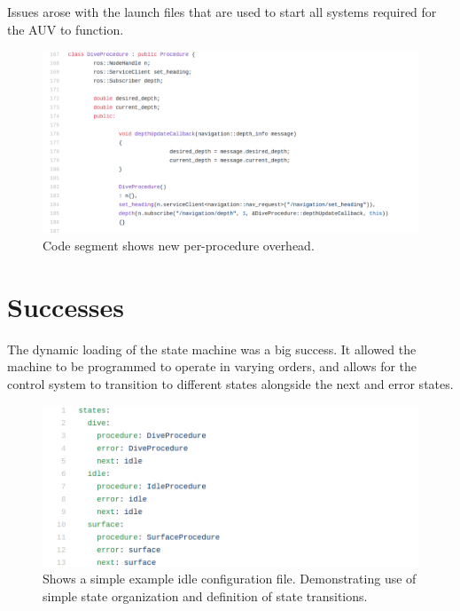 Issues arose with the launch files that are used to start all systems required
for the AUV to function. 

\begin{figure}
\centering
\includegraphics[width=150mm]{Figures/NewProcedureOverhead}
\decoRule
\caption[New Procedure Overhead]{Code segment shows new per-procedure overhead.}
\label{fig:NewProcedureOverhead}
\end{figure}

\section{Successes}

The dynamic loading of the state machine was a big success. It allowed the
machine to be programmed to operate in varying orders, and allows for the
control system to transition to different states alongside the next and error states.


\begin{figure}
\centering
\includegraphics[width=150mm]{Figures/ExampleConfig}
\decoRule
\caption[Example Configuration File]{Shows a simple example idle configuration file. Demonstrating use of simple state organization and definition of state transitions.}
\label{fig:ExampleConfig}
\end{figure}